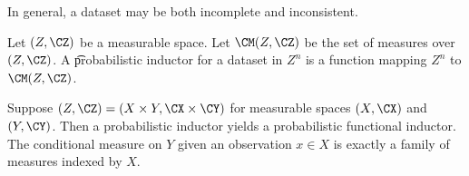 

In general, a dataset may be both incomplete and inconsistent.


Let $(Z, \CZ)$ be a measurable space.
Let $\CM(Z, \CZ)$ be the set of measures over $(Z, \CZ)$.
A \t{probabilistic inductor} for a dataset in $Z^n$ is a function mapping $Z^n$ to $\CM(Z, \CZ)$.

Suppose $(Z, \CZ) = (X \times Y, \CX \times \CY)$ for measurable spaces $(X, \CX)$ and $(Y, \CY)$.
Then a probabilistic inductor yields a probabilistic functional inductor.
The conditional measure on $Y$ given an observation $x \in X$ is exactly a family of measures indexed by $X$.

\blankpage
